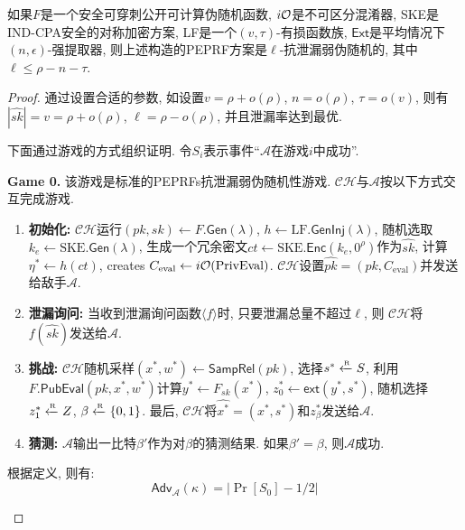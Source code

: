 \begin{theorem}
如果$F$是一个安全可穿刺公开可计算伪随机函数, $i\mathcal{O}$是不可区分混淆器, SKE是IND-CPA安全的对称加密方案, LF是一个$(v, \tau)$-有损函数族, $\mathsf{Ext}$是平均情况下$(n, \epsilon)$-强提取器, 则上述构造的PEPRF方案是$\ell$-抗泄漏弱伪随机的, 其中$\ell \leq \rho - n - \tau$. 
\end{theorem}
\begin{proof}
通过设置合适的参数, 如设置$v = \rho + o(\rho)$, $n = o(\rho)$, $\tau = o(v)$,
则有$|\hat{sk}| = v = \rho + o(\rho)$, $\ell = \rho - o(\rho)$, 并且泄漏率达到最优. 

下面通过游戏的方式组织证明. 令$S_i$表示事件``$\mathcal{A}$在游戏$i$中成功''.  
\begin{trivlist}
\item \textbf{Game 0.} 该游戏是标准的PEPRFs抗泄漏弱伪随机性游戏. $\mathcal{CH}$与$\mathcal{A}$按以下方式交互完成游戏.  
\begin{enumerate} \itemsep 1pt \parskip 0pt \parsep 0pt
    \item \textbf{初始化:} $\mathcal{CH}$运行$(pk, sk) \leftarrow F.\mathsf{Gen}(\lambda)$, 
        $h \leftarrow \text{LF}.\mathsf{GenInj}(\lambda)$, 
        随机选取$k_e \leftarrow \text{SKE}.\mathsf{Gen}(\lambda)$, 
        生成一个冗余密文$ct \leftarrow \text{SKE}.\mathsf{Enc}(k_e, 0^\rho)$作为$\hat{sk}$, 
        计算$\eta^* \leftarrow h(ct)$, creates $C_\text{eval} \leftarrow i\mathcal{O}(\text{PrivEval})$.   
        $\mathcal{CH}$设置$\hat{pk} = (pk, C_\text{eval})$并发送给敌手$\mathcal{A}$. 

    \item \textbf{泄漏询问:} 当收到泄漏询问函数$\langle f \rangle$时, 只要泄漏总量不超过$\ell$, 则
        $\mathcal{CH}$将$f(\hat{sk})$发送给$\mathcal{A}$. 

    \item \textbf{挑战:} $\mathcal{CH}$随机采样$(x^*, w^*) \leftarrow \mathsf{SampRel}(pk)$, 
        选择$s^* \xleftarrow{\textup{\tiny R}} S$,  
        利用$F.\mathsf{PubEval}(pk, x^*, w^*)$计算$y^* \leftarrow F_{sk}(x^*)$,  
        $z_0^* \leftarrow \mathsf{ext}(y^*, s^*)$, 
        随机选择$z_1^* \xleftarrow{\textup{\tiny R}} Z$, $\beta \xleftarrow{\textup{\tiny R}} \{0,1\}$. 
        最后, $\mathcal{CH}$将$\hat{x^*} = (x^*, s^*)$和$z_\beta^*$发送给$\mathcal{A}$. 

    \item \textbf{猜测:} $\mathcal{A}$输出一比特$\beta'$作为对$\beta$的猜测结果. 如果$\beta' = \beta$, 则$\mathcal{A}$成功.   
\end{enumerate}
根据定义, 则有: 
\begin{equation*}
    \mathsf{Adv}_\mathcal{A}(\kappa) = |\Pr[S_0] - 1/2|
\end{equation*}


\end{trivlist}
\end{proof}
